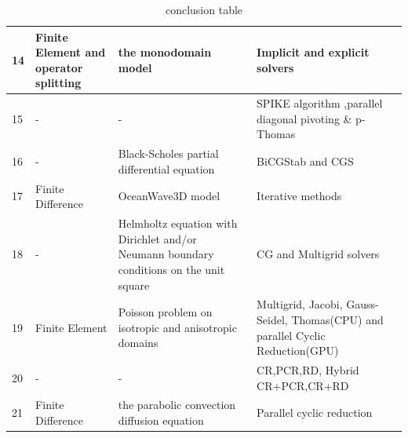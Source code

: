 \begin{table}[t]
\begin{center}
\begin{tabular}{| l | p{4cm} | p{6cm} | p{6cm} |}
       14	& Finite Element and operator splitting	& the monodomain model	& Implicit and explicit solvers \\ \hline
        15	& - &	-	& SPIKE algorithm ,parallel diagonal pivoting \& p-Thomas\\ \hline
        16	& - &	Black-Scholes partial differential equation &	BiCGStab and CGS\\ \hline
        17	& Finite Difference	& OceanWave3D model 	& Iterative methods\\ \hline
        18	& - &	Helmholtz equation with Dirichlet and/or Neumann boundary conditions on the unit square &	CG and Multigrid  solvers\\ \hline
       19	& Finite Element	& Poisson problem on isotropic and anisotropic domains	& Multigrid, Jacobi, Gauss-Seidel, Thomas(CPU) and parallel Cyclic Reduction(GPU) \\ \hline
       20 &	- &	-	& CR,PCR,RD, Hybrid CR+PCR,CR+RD \\ \hline
       21	&  Finite Difference	& the parabolic convection diffusion equation &	Parallel cyclic reduction\\ \hline
        
        \hline
        \end{tabular}
    \end{center}

    \caption{conclusion table}
    \label{table:concl}
\end{table}



